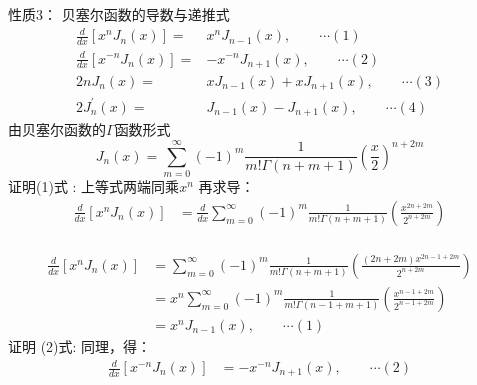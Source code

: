 \begin{frame}
	\alert{性质3：} 贝塞尔函数的导数与递推式 \\
	\begin{equation*}
		\begin{split}
			\frac{d}{d x}\left[x^{n} J_{n}(x)\right]= &x^{n} J_{n-1}(x),\qquad \cdots (1) \\
			\frac{d}{d x}\left[x^{-n} J_{n}(x)\right]=& -x^{-n} J_{n+1}(x) ,\qquad \cdots (2) \\
			2 n J_{n}(x)=&xJ_{n-1}(x)+x J_{n+1}(x) ,\qquad \cdots (3) \\
			2 J_{n}^{\prime}(x)=&J_{n-1}(x)-J_{n+1}(x) ,\qquad \cdots (4) 
		\end{split}
	\end{equation*}		
	由贝塞尔函数的$\Gamma$函数形式 
	\begin{equation*}
		J_n(x) = \sum\limits_{m=0}^{\infty} (-1)^m  \frac{1}{m! \Gamma(n+m+1) } (\frac{x}{2})^{n+2m} 
	\end{equation*}	 
	\alert{证明(1)式} : 上等式两端同乘$x^n$ 再求导：
	\begin{equation*}
	\begin{split}
		\frac{d}{dx} [x^n J_n(x)]&= \frac{d}{dx}\sum\limits_{m=0}^{\infty} (-1)^m  
		\frac{1}{m! \Gamma(n+m+1) } (\frac{x^{2n+2m}}{2^{n+2m}})\\	
	\end{split}
	\end{equation*}		
\end{frame}	

\begin{frame}
	\begin{equation*}
		\begin{split}
			\frac{d}{dx} [x^n J_n(x)] &=\sum\limits_{m=0}^{\infty} (-1)^m  
			\frac{1}{m! \Gamma(n+m+1) } (\frac{(2n+2m)x^{2n-1+2m}}{2^{n+2m}})\\
			&=x^n\sum\limits_{m=0}^{\infty} (-1)^m  
			\frac{1}{m! \Gamma(n-1+m+1) } (\frac{x^{n-1+2m}}{2^{n-1+2m}})\\ 
			&=x^n J_{n-1}(x) ,\qquad \cdots (1) 
		\end{split}
	\end{equation*}	
	\alert{证明 (2)式}: 同理，得：
	\begin{equation*}
		\begin{split}
		\frac{d}{d x}\left[x^{-n} J_{n}(x)\right]&=-x^{-n} J_{n+1}(x) ,\qquad \cdots (2) \\
		\end{split}
	\end{equation*}	 
\end{frame}

